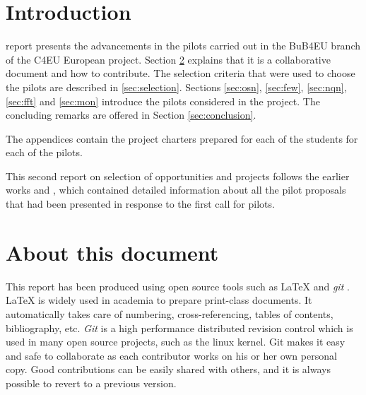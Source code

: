 \documentclass[draftclsnofoot,12pt,journal,onecolumn]{IEEEtran}
\begin{document}
\section{Introduction}
% 
% 
% 
% 
 report presents the advancements in the pilots carried out in the BuB4EU branch of the C4EU European project.
Section \ref{sec:about} explains that it is a collaborative document and how to contribute.
The selection criteria that were used to choose the pilots are described in \ref{sec:selection}.
Sections \ref{sec:osn}, \ref{sec:few}, \ref{sec:nqn}, \ref{sec:fft} and \ref{sec:mon} introduce the pilots considered in the project.
The concluding remarks are offered in Section \ref{sec:conclusion}.

The appendices contain the project charters prepared for each of the students for each of the pilots.

This second report on selection of opportunities and projects follows the earlier works \cite{barcelo2012bpp} and \cite{barcelo2012bub}, which contained detailed information about all the pilot proposals that had been presented in response to the first call for pilots.

\section{About this document}
\label{sec:about}

This report has been produced using open source tools such as {\LaTeX} \cite{lamport1994ldp} and \emph{git} \cite{chacon2009pg}.
{\LaTeX} is widely used in academia to prepare print-class documents.
It automatically takes care of numbering, cross-referencing, tables of contents, bibliography, etc.
\emph{Git} is a high performance distributed revision control which is used in many open source projects, such as the linux kernel.
Git makes it easy and safe to collaborate as each contributor works on his or her own personal copy.
Good contributions can be easily shared with others, and it is always possible to revert to a previous version.
\end{document}
